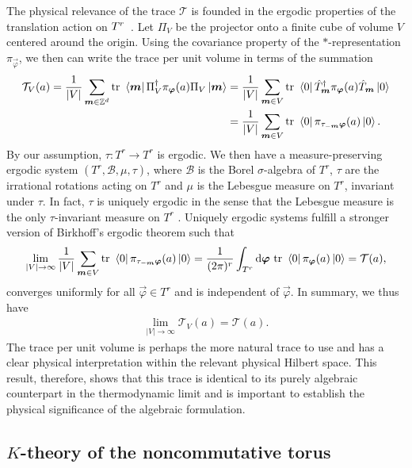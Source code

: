 \documentclass[submission, Phys]{SciPost}
\begin{document}
The physical relevance of the trace $\mathcal{T}$ is founded in the ergodic properties of the translation action on $T^r$~\cite{Prodan2017}.
Let $\Pi_V$ be the projector onto a finite cube of volume $V$ centered around the origin.
Using the covariance property of the $\ast$-representation $\pi_{\vec{\varphi}}$, we then can write the trace per unit volume 
in terms of the summation
\begin{align}
   \mathcal{T}_V(a)= \frac{1}{|V|} \sum_{\boldsymbol{m} \in \mathbb{Z}^d} \mathrm{tr}~ \bra{\boldsymbol{m}} \Pi_V^\dagger \pi_{\boldsymbol{\varphi}}(a) \Pi_V \ket{\boldsymbol{m}}
   &= \frac{1}{|V|} \sum_{\boldsymbol{m} \in V} \mathrm{tr}~ \bra{0} \hat{T}_{\boldsymbol{m}}^\dagger \pi_{\boldsymbol{\varphi}}(a) \hat{T}_{\boldsymbol{m}}\ket{0}
   \\
   &= \frac{1}{|V|} \sum_{\boldsymbol{m} \in V} \mathrm{tr}~ \bra{0} \pi_{ \tau_{-\boldsymbol{m}}\boldsymbol{\varphi}}(a) \ket{0}.
\end{align}
By our assumption, $\tau\colon T^r \to T^r$ is ergodic. We then have a measure-preserving ergodic system $(T^r, \mathscr{B}, \mu, \tau)$, where $\mathscr{B}$ is the Borel $\sigma$-algebra of $T^r$, $\tau$ are the irrational rotations acting on $T^r$ and $\mu$ is the Lebesgue measure on $T^r$, invariant under $\tau$.
In fact, $\tau$ is uniquely ergodic in the sense that the Lebesgue measure is the only $\tau$-invariant measure on $T^r$ \cite[Def. 4.1.7.]{Katok1995}.
Uniquely ergodic systems fulfill a stronger version of Birkhoff's ergodic theorem \cite[Prop. 4.1.13.]{Katok1995} such that
\begin{align}
    \lim_{|V| \to \infty} \frac{1}{|V|} \sum_{\boldsymbol{m} \in V} \mathrm{tr}~ \bra{0} \pi_{ \tau_{-\boldsymbol{m}}\boldsymbol{\varphi}}(a) \ket{0}
    = 
    \frac{1}{(2\pi)^{r}} \int_{T^r}\mathrm{d} \boldsymbol{\varphi} ~ \mathrm{tr}~ \bra{0} \pi_{ \boldsymbol{\varphi}}(a) \ket{0} = \mathcal{T}(a),
\end{align}
converges uniformly for all $\vec{\varphi} \in T^r$ and is independent of $\vec{\varphi}$.
In summary, we thus have
\begin{align}
    \lim_{|V| \to \infty} \mathcal{T}_V(a) = \mathcal{T}(a).
\end{align}
The trace per unit volume is perhaps the more natural trace to use and has a clear physical interpretation within the relevant physical Hilbert space.
This result, therefore, shows that this trace is identical to its purely algebraic counterpart in the thermodynamic limit and is important to establish the physical significance of the algebraic formulation.

\subsection{\texorpdfstring{$K$}{K}-theory of the noncommutative torus}
\label{subsec:k_theory}
\end{document}
